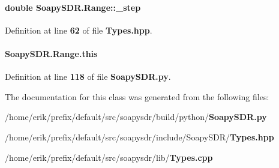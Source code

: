 \paragraph[{\+\_\+step}]{\setlength{\rightskip}{0pt plus 5cm}double Soapy\+S\+D\+R.\+Range\+::\+\_\+step\hspace{0.3cm}{\ttfamily [private]}}\label{classSoapySDR_1_1Range_a55cf4346cadf206b20f082f4b5e6eb6e}


Definition at line {\bf 62} of file {\bf Types.\+hpp}.

\paragraph[{this}]{\setlength{\rightskip}{0pt plus 5cm}Soapy\+S\+D\+R.\+Range.\+this}\label{classSoapySDR_1_1Range_a4b9045ae385b1a736238e5f3fd462864}


Definition at line {\bf 118} of file {\bf Soapy\+S\+D\+R.\+py}.



The documentation for this class was generated from the following files\+:\begin{DoxyCompactItemize}
\item 
/home/erik/prefix/default/src/soapysdr/build/python/{\bf Soapy\+S\+D\+R.\+py}\item 
/home/erik/prefix/default/src/soapysdr/include/\+Soapy\+S\+D\+R/{\bf Types.\+hpp}\item 
/home/erik/prefix/default/src/soapysdr/lib/{\bf Types.\+cpp}\end{DoxyCompactItemize}
